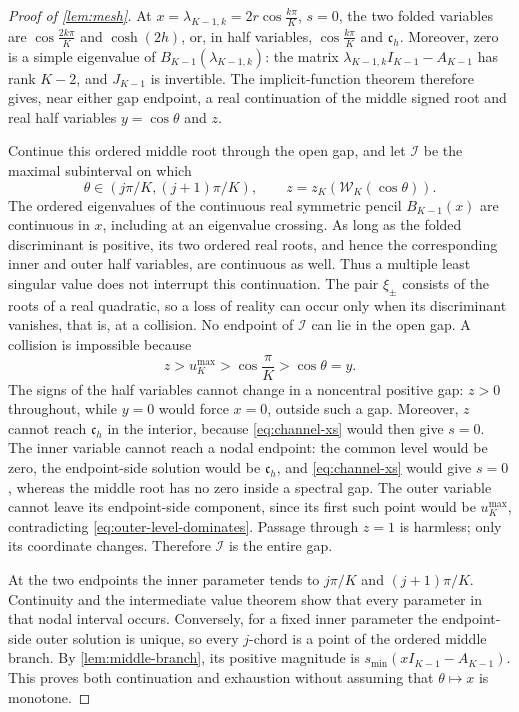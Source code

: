 \documentclass[review,hidelinks,onefignum,onetabnum]{siamart251216}
\begin{document}
\begin{proof}[Proof of \cref{lem:mesh}]
At \(x=\lambda_{K-1,k}=2r\cos\frac{k\pi}{K}\), \(s=0\), the two
folded variables are \(\cos\frac{2k\pi}{K}\) and
\(\cosh(2h)\), or, in half variables, \(\cos\frac{k\pi}{K}\) and
\(\mathfrak c_h\).  Moreover, zero is a simple eigenvalue of
\(B_{K-1}(\lambda_{K-1,k})\): the matrix
\(\lambda_{K-1,k}I_{K-1}-A_{K-1}\) has rank \(K-2\), and \(J_{K-1}\) is
invertible.  The implicit-function theorem therefore gives, near either
gap endpoint, a real continuation of the middle signed root and real
half variables \(y=\cos\theta\) and \(z\).

Continue this ordered middle root through the open gap, and let
\(\mathcal I\) be the maximal subinterval on which
\[
 \theta\in(j\pi/K,(j+1)\pi/K),\qquad
 z=z_K(\mathcal W_K(\cos\theta)).
\]
The ordered eigenvalues of the continuous real symmetric pencil
\(B_{K-1}(x)\) are continuous in \(x\), including at an eigenvalue
crossing.  As long as the folded discriminant is positive, its two
ordered real roots, and hence the corresponding inner and outer half
variables, are continuous as well.  Thus a multiple least singular value
does not interrupt this continuation.
The pair \(\xi_\pm\) consists of the roots of a real quadratic, so a
loss of reality can occur only when its discriminant vanishes, that is,
at a collision.  No endpoint of \(\mathcal I\) can lie in the open gap.
A collision is
impossible because
\[
 z>u_K^{\max}>\cos\frac{\pi}{K}>\cos\theta=y.
\]
The signs of the half variables cannot change in a noncentral positive
gap: \(z>0\) throughout, while \(y=0\) would force \(x=0\), outside
such a gap.  Moreover, \(z\) cannot reach \(\mathfrak c_h\) in the interior,
because \eqref{eq:channel-xs} would then give \(s=0\).
The inner variable cannot reach a nodal endpoint: the common level
would be zero, the endpoint-side solution would be \(\mathfrak c_h\), and
\eqref{eq:channel-xs} would give \(s=0\), whereas the middle root has no
zero inside a spectral gap.  The outer variable cannot leave its
endpoint-side component, since its first such point would be
\(u_K^{\max}\), contradicting
\eqref{eq:outer-level-dominates}.  Passage through \(z=1\) is harmless;
only its coordinate changes.  Therefore \(\mathcal I\) is the entire
gap.

At the two endpoints the inner parameter tends to \(j\pi/K\) and
\((j+1)\pi/K\).  Continuity and the intermediate value theorem show
that every parameter in that nodal interval occurs.  Conversely, for a
fixed inner parameter the endpoint-side outer solution is unique, so
every $j$-chord is a point of the ordered middle branch.  By
\cref{lem:middle-branch}, its positive magnitude is
\(s_{\min}(xI_{K-1}-A_{K-1})\).  This proves both continuation and
exhaustion without assuming that \(\theta\mapsto x\) is monotone.


\end{proof}
\end{document}

